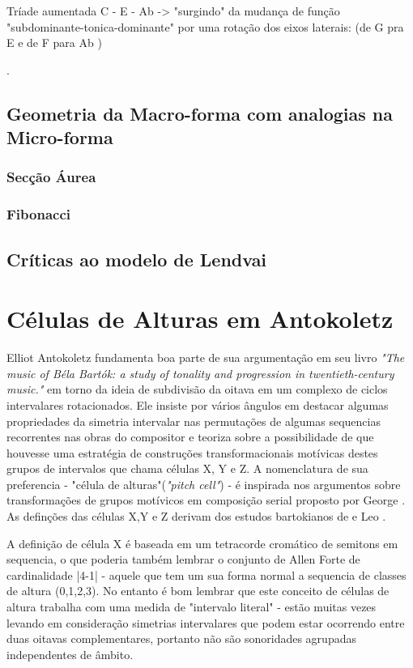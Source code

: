 \documentclass[
	12pt,				%
	openright,			%
	twoside,			%
	a4paper,			%
	english,			%
	french,				%
	spanish,			%
	brazil				%
	]{abntex2}
\begin{document}
Tríade aumentada C - E - Ab -> "surgindo" da mudança de função "subdominante-tonica-dominante" por uma rotação dos eixos laterais:
(de G pra E e de F para Ab )

.
\subsection{Geometria da Macro-forma com analogias na Micro-forma}

\subsubsection{Secção Áurea}


\subsubsection{Fibonacci}

\subsection{Críticas ao modelo de Lendvai}

\section{Células de Alturas em Antokoletz}


Elliot Antokoletz fundamenta boa parte de sua argumentação em seu livro \textit{"The music of Béla Bartók: a study of tonality and progression in twentieth-century music."}\cite{antokoletz1984music} em torno da ideia de subdivisão da oitava em um complexo de ciclos intervalares rotacionados. Ele insiste por vários ângulos em destacar algumas propriedades da simetria intervalar nas permutações de algumas sequencias recorrentes nas obras do compositor e teoriza sobre a possibilidade de que houvesse uma estratégia de construções transformacionais motívicas destes grupos de intervalos que chama células X, Y e Z. A nomenclatura de sua preferencia - "célula de alturas"(\textit{"pitch cell"}) - é inspirada nos argumentos sobre transformações de grupos motívicos em composição serial proposto por George . As definções das células X,Y e Z derivam dos estudos bartokianos de  e Leo .

A definição de célula X é baseada em um tetracorde cromático de semitons em sequencia, o que poderia também lembrar o conjunto de Allen Forte de cardinalidade |4-1| - aquele que tem um sua forma normal a sequencia de classes de altura (0,1,2,3). No entanto é bom lembrar que este conceito de células de altura trabalha com uma medida de "intervalo literal" - estão muitas vezes levando em consideração simetrias intervalares que podem estar ocorrendo entre duas oitavas complementares, portanto não são sonoridades agrupadas independentes de âmbito.
\end{document}
